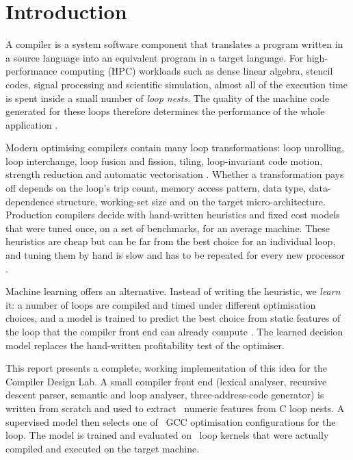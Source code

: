 

\newpage

\section{Introduction}

A compiler is a system software component that translates a program written in
a source language into an equivalent program in a target language. For
high-performance computing (HPC) workloads such as dense linear algebra,
stencil codes, signal processing and scientific simulation, almost all of the
execution time is spent inside a small number of \emph{loop nests}. The quality
of the machine code generated for these loops therefore determines the
performance of the whole application \cite{allen2002,bacon1994}.

Modern optimising compilers contain many loop transformations: loop unrolling,
loop interchange, loop fusion and fission, tiling, loop-invariant code motion,
strength reduction and automatic vectorisation \cite{aho2006,cooper2007,muchnick1997}.
Whether a transformation pays off depends on the loop's trip count, memory
access pattern, data type, data-dependence structure, working-set size and on
the target micro-architecture. Production compilers decide with hand-written
heuristics and fixed cost models that were tuned once, on a set of benchmarks, for
an average machine. These heuristics are cheap but can be far from the best choice
for an individual loop, and tuning them by hand is slow and has to be repeated
for every new processor \cite{wang2018,ashouri2018}.

Machine learning offers an alternative. Instead of writing the heuristic, we
\emph{learn} it: a number of loops are compiled and timed under different
optimisation choices, and a model is trained to predict the best choice from
static features of the loop that the compiler front end can already compute
\cite{stephenson2003,stephenson2005,fursin2011}. The learned decision model
replaces the hand-written profitability test of the optimiser.

This report presents a complete, working implementation of this idea for the
Compiler Design Lab. A small compiler front end (lexical analyser, recursive
descent parser, semantic and loop analyser, three-address-code generator) is
written from scratch and used to extract \numFeatures\ numeric features from C
loop nests. A supervised model then selects one of \numConfigs\ GCC optimisation
configurations for the loop. The model is trained and evaluated on
\numKernels\ loop kernels that were actually compiled and executed on the
target machine.

